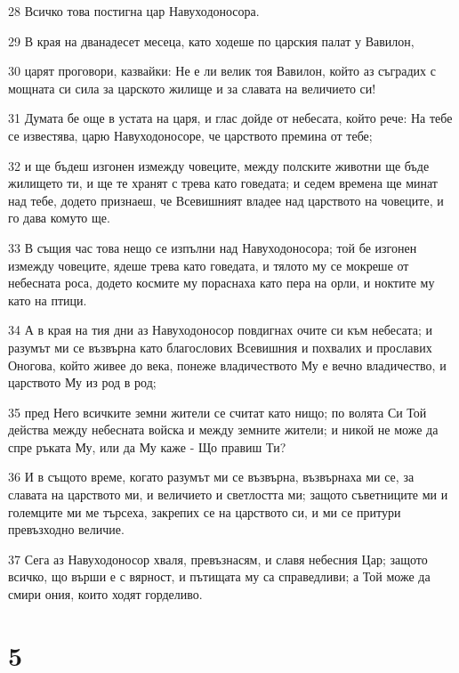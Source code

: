 \par 28 Всичко това постигна цар Навуходоносора.
\par 29 В края на дванадесет месеца, като ходеше по царския палат у Вавилон,
\par 30 царят проговори, казвайки: Не е ли велик тоя Вавилон, който аз съградих с мощната си сила за царското жилище и за славата на величието си!
\par 31 Думата бе още в устата на царя, и глас дойде от небесата, който рече: На тебе се известява, царю Навуходоносоре, че царството премина от тебе;
\par 32 и ще бъдеш изгонен измежду човеците, между полските животни ще бъде жилището ти, и ще те хранят с трева като говедата; и седем времена ще минат над тебе, додето признаеш, че Всевишният владее над царството на човеците, и го дава комуто ще.
\par 33 В същия час това нещо се изпълни над Навуходоносора; той бе изгонен измежду човеците, ядеше трева като говедата, и тялото му се мокреше от небесната роса, додето космите му пораснаха като пера на орли, и ноктите му като на птици.
\par 34 А в края на тия дни аз Навуходоносор повдигнах очите си към небесата; и разумът ми се възвърна като благослових Всевишния и похвалих и прославих Оногова, който живее до века, понеже владичеството Му е вечно владичество, и царството Му из род в род;
\par 35 пред Него всичките земни жители се считат като нищо; по волята Си Той действа между небесната войска и между земните жители; и никой не може да спре ръката Му, или да Му каже - Що правиш Ти?
\par 36 И в същото време, когато разумът ми се възвърна, възвърнаха ми се, за славата на царството ми, и величието и светлостта ми; защото съветниците ми и големците ми ме търсеха, закрепих се на царството си, и ми се притури превъзходно величие.
\par 37 Сега аз Навуходоносор хваля, превъзнасям, и славя небесния Цар; защото всичко, що върши е с вярност, и пътищата му са справедливи; а Той може да смири ония, които ходят горделиво.

\chapter{5}

